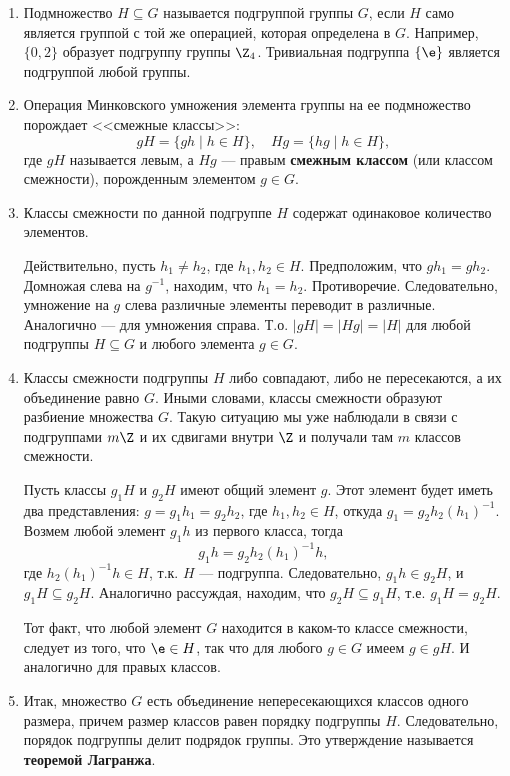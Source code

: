 \begin{enumerate}


\item Подмножество $H\subseteq G$ называется подгруппой группы $G$, если $H$ само является группой с той же операцией, которая определена в $G$. Например, $\{0,2\}$ образует подгруппу группы $\Z_4$. Тривиальная подгруппа $\{\e\}$ является подгруппой любой группы.

\item Операция Минковского умножения элемента группы на ее подмножество порождает <<смежные классы>>:
$$
gH=\{gh\mid h\in H\},\quad Hg=\{hg\mid h\in H\},
$$
где $gH$ называется левым, а $Hg$ --- правым \textbf{смежным классом} (или классом смежности), порожденным элементом $g\in G$.

\item Классы смежности по данной подгруппе $H$ содержат одинаковое количество элементов.

Действительно, пусть $h_1\ne h_2$, где $h_1,h_2\in H$. Предположим, что $gh_1=gh_2$. Домножая слева на $g^{-1}$, находим, что $h_1=h_2$. Противоречие. Следовательно, умножение на $g$ слева различные элементы переводит в различные. Аналогично --- для умножения справа. Т.о. $|gH|=|Hg|=|H|$ для любой подгруппы $H\subseteq G$ и любого элемента $g\in G$.

\item Классы смежности подгруппы $H$ либо совпадают, либо не пересекаются, а их объединение равно $G$. Иными словами, классы смежности образуют разбиение множества $G$. Такую ситуацию мы уже наблюдали в связи с подгруппами $m\Z$ и их сдвигами внутри $\Z$ и получали там $m$ классов смежности.

Пусть классы $g_1H$ и $g_2H$ имеют общий элемент $g$. Этот элемент будет иметь два представления: $g=g_1h_1=g_2h_2$, где $h_1,h_2\in H$, откуда $g_1=g_2h_2(h_1)^{-1}$. Возмем любой элемент $g_1h$ из первого класса, тогда
$$
g_1h = g_2h_2(h_1)^{-1}h,
$$
где $h_2(h_1)^{-1}h\in H$, т.к. $H$ --- подгруппа. Следовательно, $g_1h\in g_2H$, и $g_1H\subseteq g_2H$. Аналогично рассуждая, находим, что $g_2H\subseteq g_1H$, т.е. $g_1H=g_2H$.

Тот факт, что любой элемент $G$ находится в каком-то классе смежности, следует из того, что $\e\in H$, так что для любого $g\in G$ имеем $g\in gH$. И аналогично для правых классов.

\item Итак, множество $G$ есть объединение непересекающихся классов одного размера, причем размер классов равен порядку подгруппы $H$. Следовательно, порядок подгруппы делит подрядок группы. Это утверждение называется \textbf{теоремой Лагранжа}.


\end{enumerate}
